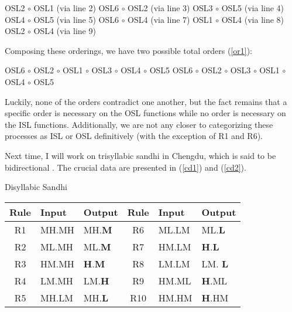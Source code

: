 \documentclass{article}
\begin{document}
\begin{exe}
\ex
\begin{xlist}
	\ex OSL2 $\circ$ OSL1 (via line 2)
	\ex OSL6 $\circ$ OSL2 (via line 3)
	\ex OSL3 $\circ$ OSL5 (via line 4)
	\ex OSL4 $\circ$ OSL5 (via line 5)
	\ex OSL6 $\circ$ OSL4 (via line 7)
	\ex OSL1 $\circ$ OSL4 (via line 8)
	\ex OSL2 $\circ$ OSL4 (via line 9)  
\end{xlist}
\end{exe}
Composing these orderings, we have two possible total orders (\ref{or1}):
\begin{exe}
\ex \label{or1}
\begin{xlist}
	\ex OSL6 $\circ$ OSL2 $\circ$ OSL1 $\circ$ OSL3 $\circ$ OSL4 $\circ$ OSL5
	\ex OSL6 $\circ$ OSL2 $\circ$ OSL3 $\circ$ OSL1 $\circ$ OSL4 $\circ$ OSL5
\end{xlist}
\end{exe}
Luckily, none of the orders contradict one another, but the fact remains that a specific order is necessary on the OSL functions while no order is necessary on the ISL functions. Additionally, we are not any closer to categorizing these processes as ISL or OSL definitively (with the exception of R1 and R6). \par
Next time, I will work on trisyllabic sandhi in Chengdu, which is said to be bidirectional \cite{Yan2016}. The crucial data are presented in (\ref{cd1}) and (\ref{cd2}).
\begin{exe}
\ex \label{cd1}
Disyllabic Sandhi \\
\begin{tabular}[t]{|c|l|l||c|l|l|}
\hline
Rule & Input & Output & Rule & Input & Output \\
\hline
R1 & MH.MH & MH.\textbf{M} &  R6 & ML.LM & ML.\textbf{L} \\
\hline
R2 & ML.MH & ML.\textbf{M} & R7 & HM.LM & \textbf{H}.\textbf{L} \\
\hline
R3 & HM.MH & \textbf{H}.\textbf{M} & R8 & LM.LM & LM. \textbf{L} \\
\hline
R4 & LM.MH & LM.\textbf{H} & R9 & HM.ML & \textbf{H}.ML \\ 
\hline
R5 & MH.LM & MH.\textbf{L}& R10 & HM.HM & \textbf{H}.HM \\
\hline
\end{tabular}
\end{exe}
\end{document}
